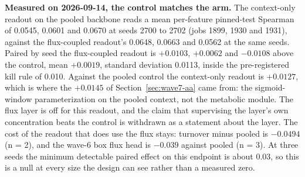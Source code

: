 

\textbf{Measured on 2026-09-14, the control matches the arm.} The context-only readout on
the pooled backbone reads a mean per-feature pinned-test Spearman of 0.0545, 0.0601 and
0.0670 at seeds 2700 to 2702 (jobs 1899, 1930 and 1931), against the flux-coupled readout's
0.0648, 0.0663 and 0.0562 at the same seeds. Paired by seed the flux-coupled readout is
$+0.0103$, $+0.0062$ and $-0.0108$ above the control, mean $+0.0019$, standard deviation
0.0113, inside the pre-registered kill rule of 0.010. Against the pooled control the
context-only readout is $+0.0127$, which is where the $+0.0145$ of
Section~\ref{sec:wave7-aa} came from: the sigmoid-window parameterization on the pooled
context, not the metabolic module. The flux layer is off for this readout, and the claim
that supervising the layer's own concentration beats the control is withdrawn as a
statement about the layer. The cost of the readout that does use the flux stays: turnover
minus pooled is $-0.0494$ (n = 2), and the wave-6 box flux head is $-0.039$ against pooled
(n = 3). At three seeds the minimum detectable paired effect on this endpoint is about
0.03, so this is a null at every size the design can see rather than a measured zero.

